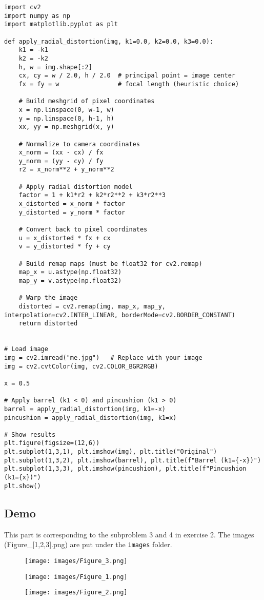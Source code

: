\documentclass[12pt]{article}
\begin{document}
\begin{verbatim}
import cv2
import numpy as np
import matplotlib.pyplot as plt

def apply_radial_distortion(img, k1=0.0, k2=0.0, k3=0.0):
    k1 = -k1
    k2 = -k2
    h, w = img.shape[:2]
    cx, cy = w / 2.0, h / 2.0  # principal point = image center
    fx = fy = w                # focal length (heuristic choice)

    # Build meshgrid of pixel coordinates
    x = np.linspace(0, w-1, w)
    y = np.linspace(0, h-1, h)
    xx, yy = np.meshgrid(x, y)

    # Normalize to camera coordinates
    x_norm = (xx - cx) / fx
    y_norm = (yy - cy) / fy
    r2 = x_norm**2 + y_norm**2

    # Apply radial distortion model
    factor = 1 + k1*r2 + k2*r2**2 + k3*r2**3
    x_distorted = x_norm * factor
    y_distorted = y_norm * factor

    # Convert back to pixel coordinates
    u = x_distorted * fx + cx
    v = y_distorted * fy + cy

    # Build remap maps (must be float32 for cv2.remap)
    map_x = u.astype(np.float32)
    map_y = v.astype(np.float32)

    # Warp the image
    distorted = cv2.remap(img, map_x, map_y, interpolation=cv2.INTER_LINEAR, borderMode=cv2.BORDER_CONSTANT)
    return distorted


# Load image
img = cv2.imread("me.jpg")   # Replace with your image
img = cv2.cvtColor(img, cv2.COLOR_BGR2RGB)

x = 0.5

# Apply barrel (k1 < 0) and pincushion (k1 > 0)
barrel = apply_radial_distortion(img, k1=-x)
pincushion = apply_radial_distortion(img, k1=x)

# Show results
plt.figure(figsize=(12,6))
plt.subplot(1,3,1), plt.imshow(img), plt.title("Original")
plt.subplot(1,3,2), plt.imshow(barrel), plt.title(f"Barrel (k1={-x})")
plt.subplot(1,3,3), plt.imshow(pincushion), plt.title(f"Pincushion (k1={x})")
plt.show()
\end{verbatim}
\subsection{Demo}
This part is corresponding to the subproblem 3 and 4 in exercise 2. The images (Figure\_[1,2,3].png) are put under the \texttt{images} folder.
\begin{figure}[H]
    \centering
    \texttt{[image: images/Figure\_3.png]}
\end{figure}
\begin{figure}[H]
    \centering
    \texttt{[image: images/Figure\_1.png]}
\end{figure}
\begin{figure}[H]
    \centering
    \texttt{[image: images/Figure\_2.png]}
\end{figure}
\end{document}
